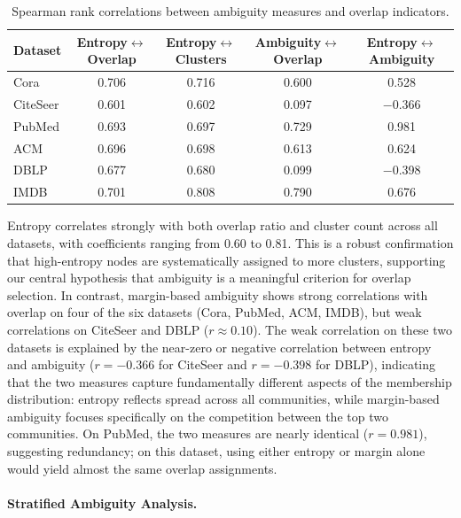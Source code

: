 \documentclass[pdflatex,sn-mathphys-num]{sn-jnl}%
\theoremstyle{thmstyleone}%
\theoremstyle{thmstyletwo}%
\theoremstyle{thmstylethree}%
\begin{document}
\begin{table}[ht]
\centering
\caption{Spearman rank correlations between ambiguity measures and overlap indicators.}
\label{tab:correlations}
\begin{tabular}{lcccc}
\toprule
\textbf{Dataset} & \textbf{Entropy$\leftrightarrow$Overlap} & \textbf{Entropy$\leftrightarrow$Clusters} & \textbf{Ambiguity$\leftrightarrow$Overlap} & \textbf{Entropy$\leftrightarrow$Ambiguity} \\
\midrule
Cora      & 0.706 & 0.716 & 0.600 & 0.528 \\
CiteSeer  & 0.601 & 0.602 & 0.097 & $-$0.366 \\
PubMed    & 0.693 & 0.697 & 0.729 & 0.981 \\
ACM       & 0.696 & 0.698 & 0.613 & 0.624 \\
DBLP      & 0.677 & 0.680 & 0.099 & $-$0.398 \\
IMDB      & 0.701 & 0.808 & 0.790 & 0.676 \\
\bottomrule
\end{tabular}
\end{table}

Entropy correlates strongly with both overlap ratio and cluster count across all datasets, with coefficients ranging from 0.60 to 0.81. 
This is a robust confirmation that high-entropy nodes are systematically assigned to more clusters, supporting our central hypothesis that ambiguity is a meaningful criterion for overlap selection.
In contrast, margin-based ambiguity shows strong correlations with overlap on four of the six datasets (Cora, PubMed, ACM, IMDB), but weak correlations on CiteSeer and DBLP ($r \approx 0.10$). 
The weak correlation on these two datasets is explained by the near-zero or negative correlation between entropy and ambiguity ($r = -0.366$ for CiteSeer and $r = -0.398$ for DBLP), indicating that the two measures capture fundamentally different aspects of the membership distribution: entropy reflects spread across all communities, while margin-based ambiguity focuses specifically on the competition between the top two communities. 
On PubMed, the two measures are nearly identical ($r = 0.981$), suggesting redundancy; on this dataset, using either entropy or margin alone would yield almost the same overlap assignments.

\paragraph{Stratified Ambiguity Analysis.}
\end{document}
